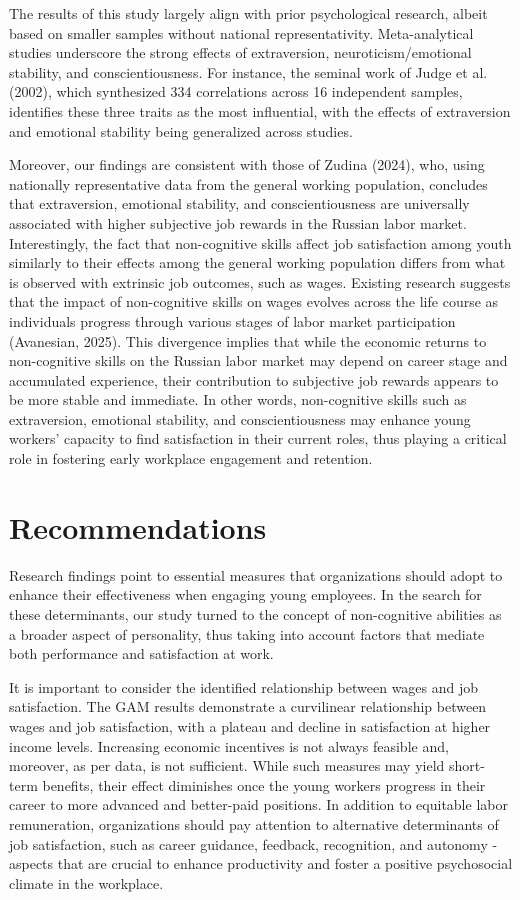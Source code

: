 \documentclass[
]{interact}
\begin{document}
The results of this study largely align with prior psychological
research, albeit based on smaller samples without national
representativity. Meta-analytical studies underscore the strong effects
of extraversion, neuroticism/emotional stability, and conscientiousness.
For instance, the seminal work of Judge et al. (2002), which synthesized
334 correlations across 16 independent samples, identifies these three
traits as the most influential, with the effects of extraversion and
emotional stability being generalized across studies.

Moreover, our findings are consistent with those of Zudina (2024), who,
using nationally representative data from the general working
population, concludes that extraversion, emotional stability, and
conscientiousness are universally associated with higher subjective job
rewards in the Russian labor market. Interestingly, the fact that
non-cognitive skills affect job satisfaction among youth similarly to
their effects among the general working population differs from what is
observed with extrinsic job outcomes, such as wages. Existing research
suggests that the impact of non-cognitive skills on wages evolves across
the life course as individuals progress through various stages of labor
market participation (Avanesian, 2025). This divergence implies that
while the economic returns to non-cognitive skills on the Russian labor
market may depend on career stage and accumulated experience, their
contribution to subjective job rewards appears to be more stable and
immediate. In other words, non-cognitive skills such as extraversion,
emotional stability, and conscientiousness may enhance young workers'
capacity to find satisfaction in their current roles, thus playing a
critical role in fostering early workplace engagement and retention.

\section{Recommendations}\label{recommendations}

Research findings point to essential measures that organizations should
adopt to enhance their effectiveness when engaging young employees. In
the search for these determinants, our study turned to the concept of
non-cognitive abilities as a broader aspect of personality, thus taking
into account factors that mediate both performance and satisfaction at
work.

It is important to consider the identified relationship between wages
and job satisfaction. The GAM results demonstrate a curvilinear
relationship between wages and job satisfaction, with a plateau and
decline in satisfaction at higher income levels. Increasing economic
incentives is not always feasible and, moreover, as per data, is not
sufficient. While such measures may yield short-term benefits, their
effect diminishes once the young workers progress in their career to
more advanced and better-paid positions. In addition to equitable labor
remuneration, organizations should pay attention to alternative
determinants of job satisfaction, such as career guidance, feedback,
recognition, and autonomy - aspects that are crucial to enhance
productivity and foster a positive psychosocial climate in the
workplace.
\end{document}
